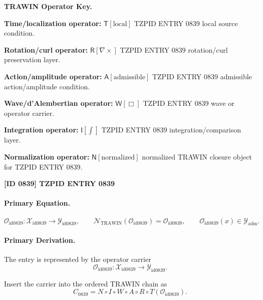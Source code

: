 \par\vspace{0.45\baselineskip}
\noindent\begin{minipage}[t]{\linewidth}
\begingroup
\small
\raggedright
\textbf{TRAWIN Operator Key.}\par
\noindent\textbf{Time/localization operator:} $\mathsf{T}\!\left[\mathrm{local}\right]$ TZPID ENTRY 0839 local source condition.\par
\noindent\textbf{Rotation/curl operator:} $\mathsf{R}\!\left[\nabla\times\right]$ TZPID ENTRY 0839 rotation/curl preservation layer.\par
\noindent\textbf{Action/amplitude operator:} $\mathsf{A}\!\left[\mathrm{admissible}\right]$ TZPID ENTRY 0839 admissible action/amplitude condition.\par
\noindent\textbf{Wave/d'Alembertian operator:} $\mathsf{W}\!\left[\Box\right]$ TZPID ENTRY 0839 wave or operator carrier.\par
\noindent\textbf{Integration operator:} $\mathsf{I}\!\left[\int\right]$ TZPID ENTRY 0839 integration/comparison layer.\par
\noindent\textbf{Normalization operator:} $\mathsf{N}\!\left[\mathrm{normalized}\right]$ normalized TRAWIN closure object for TZPID ENTRY 0839.\par
\endgroup
\end{minipage}

\clearpage
\noindent\textbf{[ID 0839] TZPID ENTRY 0839}\par
\vspace{0.35em}
\paragraph{Primary Equation.}
\[
\mathcal{O}_{\mathrm{id0839}}:\mathcal{X}_{\mathrm{id0839}}\longrightarrow \mathcal{Y}_{\mathrm{id0839}},\qquad
\mathcal{N}_{\mathrm{TRAWIN}}(\mathcal{O}_{\mathrm{id0839}})=\mathcal{O}_{\mathrm{id0839}},\qquad
\mathcal{O}_{\mathrm{id0839}}(x)\in\mathcal{Y}_{\mathrm{adm}}.
\]

\paragraph{Primary Derivation.} The entry is represented by the operator carrier\[
\mathcal{O}_{\mathrm{id0839}}:\mathcal{X}_{\mathrm{id0839}}\longrightarrow \mathcal{Y}_{\mathrm{id0839}}.
\]

Insert the carrier into the ordered TRAWIN chain as\[
C_{0839}=N\circ I\circ W\circ A\circ R\circ T(\mathcal{O}_{\mathrm{id0839}}).
\]

